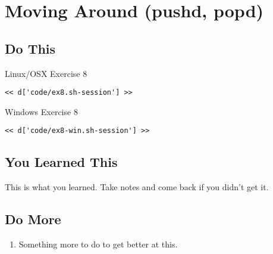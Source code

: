 \chapter{Moving Around (pushd, popd)}

\section{Do This}

\begin{code}{Linux/OSX Exercise 8}
\begin{Verbatim}
<< d['code/ex8.sh-session'] >>
\end{Verbatim}
\end{code}

\begin{code}{Windows Exercise 8}
\begin{Verbatim}
<< d['code/ex8-win.sh-session'] >>
\end{Verbatim}
\end{code}

\section{You Learned This}

This is what you learned.  Take notes and come back if you didn't get it.

\section{Do More}

\begin{enumerate}
\item Something more to do to get better at this.
\end{enumerate}

